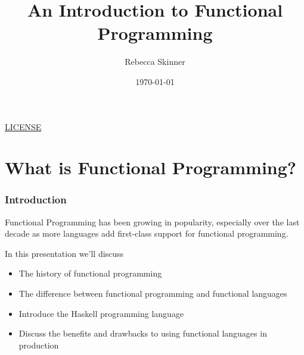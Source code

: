 \documentclass{beamer}
\title{An Introduction to Functional Programming}
\author{Rebecca Skinner}
\date{\today}
\newcommand{\chref}[3] {
  {\color{#1} \href{#2}{\underline{#3}}}
}
\begin{document}
\begin{frame}
  \titlepage{}
  \begin{center}
    \small{\chref{blue}{http://creativecommons.org/licenses/by-sa/4.0/}{LICENSE}}
  \end{center}
\end{frame}

\section{What is Functional Programming?}

\begin{frame}
  \frametitle{Introduction}
  Functional Programming has been growing in popularity, especially
  over the last decade as more languages add first-class support for
  functional programming.

  In this presentation we'll discuss
  \pause
  \begin{itemize}
  \item The history of functional programming
  \item The difference between functional programming and functional languages
  \item Introduce the Haskell programming language
  \item Discuss the benefits and drawbacks to using functional languages in production
  \end{itemize}
\end{frame}
\end{document}

